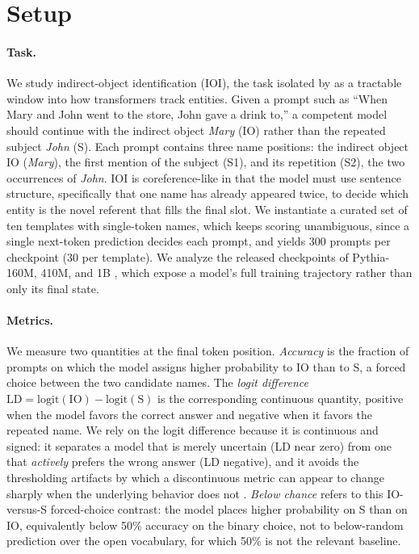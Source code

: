 \documentclass[11pt]{article}
\begin{document}
\section{Setup}
\label{sec:setup}
\paragraph{Task.}
We study indirect-object identification (IOI), the task isolated by
\citet{wang2023ioi} as a tractable window into how transformers track entities.
Given a prompt such as ``When Mary and John went to the store, John gave a drink
to,'' a competent model should continue with the indirect object \emph{Mary}
(IO) rather than the repeated subject \emph{John} (S). Each prompt contains three
name positions: the indirect object IO (\emph{Mary}), the first mention of the
subject (S1), and its repetition (S2), the two occurrences of \emph{John}. IOI
is coreference-like in that the model must use sentence structure, specifically
that one name has already appeared twice, to decide which entity is the novel
referent that fills the final slot. We instantiate a curated set of ten templates
with single-token names, which keeps scoring unambiguous, since a single
next-token prediction decides each prompt, and yields 300 prompts per checkpoint
(30 per template). We analyze the released checkpoints of Pythia-160M, 410M, and
1B \citep{biderman2023pythia}, which expose a model's full training trajectory
rather than only its final state.

\paragraph{Metrics.}
We measure two quantities at the final token position. \emph{Accuracy} is the
fraction of prompts on which the model assigns higher probability to IO than to
S, a forced choice between the two candidate names. The \emph{logit difference}
$\mathrm{LD}=\mathrm{logit}(\text{IO})-\mathrm{logit}(\text{S})$ is the
corresponding continuous quantity, positive when the model favors the correct
answer and negative when it favors the repeated name. We rely on the logit
difference because it is continuous and signed: it separates a model that is
merely uncertain (LD near zero) from one that \emph{actively} prefers the wrong
answer (LD negative), and it avoids the thresholding artifacts by which a
discontinuous metric can appear to change sharply when the underlying behavior
does not \citep{schaeffer2023mirage}. \emph{Below chance} refers to this
IO-versus-S forced-choice contrast: the model places higher probability on S
than on IO, equivalently below 50\% accuracy on the binary choice, not to
below-random prediction over the open vocabulary, for which 50\% is not the
relevant baseline.
\end{document}
